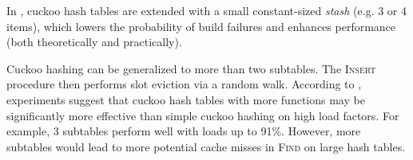 In \cite{kirsch2009more}, cuckoo hash tables are extended with a small
constant-sized \emph{stash} (e.g. 3 or 4 items), which lowers the probability
of build failures and enhances performance (both theoretically and practically).

Cuckoo hashing can be generalized to more than two subtables.
The \textsc{Insert} procedure then performs slot eviction via a random walk.
According to \cite{open-questions-cuckoo}, experiments suggest that cuckoo
hash tables with more functions may be significantly more effective than simple
cuckoo hashing on high load factors. For example, 3 subtables perform well
with loads up to 91\%. However, more subtables would lead to more potential
cache misses in \textsc{Find} on large hash tables.
